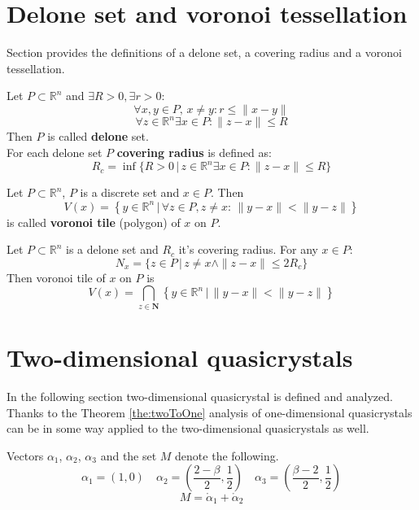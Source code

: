\documentclass[text.tex]{subfiles}
\begin{document}
\section*{Delone set and voronoi tessellation}

Section provides the definitions of a delone set, a covering radius and a voronoi tessellation.

\begin{definition}
\label{def:delone}
Let $P\subset \mathbb{R}^n$ and $\exists R>0, \exists r>0$:
$$\forall x,y\in P,\, x\neq y: r\leq \|x-y\|$$
$$\forall z\in\mathbb{R}^n \exists x\in P: \|z-x\|\leq R$$
Then $P$ is called \textbf{delone} set.\\
For each delone set $P$ \textbf{covering radius} is defined as:
$$R_c = \inf\{R>0\,|\, z\in\mathbb{R}^n \exists x\in P: \|z-x\|\leq R\}$$
\end{definition}

\begin{definition}
Let $P\subset \mathbb{R}^n$, $P$ is a discrete set and $x\in P$. Then
$$V(x) = \left\{ y \in \mathbb{R}^n \,|\, \forall z \in P, z\neq x:\, \|y-x\|<\|y-z\| \right\}$$
is called \textbf{voronoi tile} (polygon) of $x$ on $P$.
\end{definition}

\begin{theorem}
\label{the:radiusLimit}
Let $P\subset \mathbb{R}^n$ is a delone set and $R_c$ it's covering radius. For any $x\in P$:
$$N_x = \{z\in P\,|\, z\neq x \wedge \|z-x\|\leq 2R_c\}$$
Then voronoi tile of $x$ on $P$ is
$$V(x) = \bigcap_{z\in \boldsymbol{N}} \left\{ y \in \mathbb{R}^n \,|\, \|y-x\|<\|y-z\| \right\}$$
\end{theorem}

\section{Two-dimensional quasicrystals}%
\label{sec:twoDimension}
In the following section two-dimensional quasicrystal is defined and analyzed. Thanks to the Theorem \ref{the:twoToOne} analysis of one-dimensional quasicrystals can be in some way applied to the two-dimensional quasicrystals as well. 
\begin{definition}
Vectors $\alpha_1$, $\alpha_2$, $\alpha_3$ and the set $M$ denote the following.
$$\alpha_1 = \left( 1,0 \right) \quad \alpha_2 = \left( \frac{2-\beta}{2}, \frac{1}{2} \right) \quad \alpha_3 = \left( \frac{\beta-2}{2}, \frac{1}{2} \right)$$
$$M = \ring\alpha_1 + \ring\alpha_2$$
\end{definition}
\end{document}
